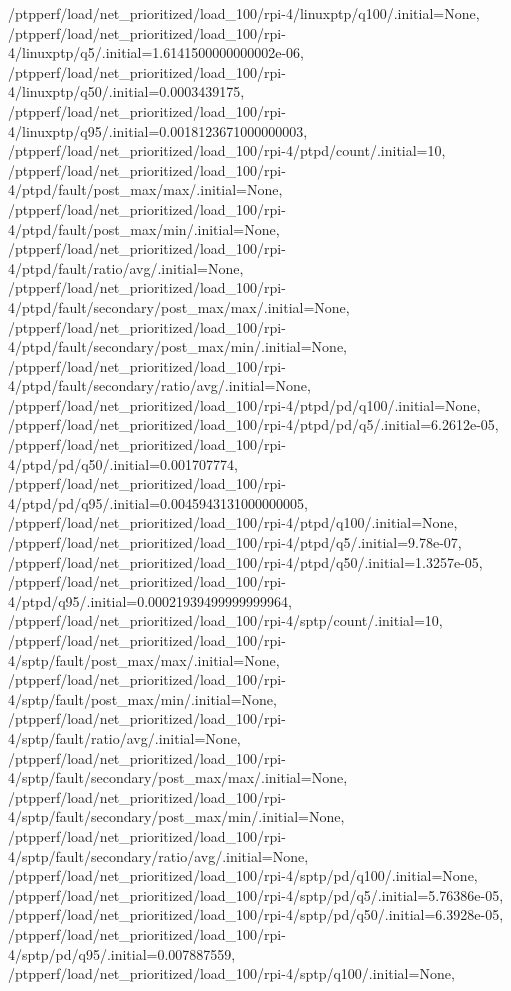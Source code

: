 {    /ptpperf/load/net_prioritized/load_100/rpi-4/linuxptp/q100/.initial=None,
    /ptpperf/load/net_prioritized/load_100/rpi-4/linuxptp/q5/.initial=1.6141500000000002e-06,
    /ptpperf/load/net_prioritized/load_100/rpi-4/linuxptp/q50/.initial=0.0003439175,
    /ptpperf/load/net_prioritized/load_100/rpi-4/linuxptp/q95/.initial=0.0018123671000000003,
    /ptpperf/load/net_prioritized/load_100/rpi-4/ptpd/count/.initial=10,
    /ptpperf/load/net_prioritized/load_100/rpi-4/ptpd/fault/post_max/max/.initial=None,
    /ptpperf/load/net_prioritized/load_100/rpi-4/ptpd/fault/post_max/min/.initial=None,
    /ptpperf/load/net_prioritized/load_100/rpi-4/ptpd/fault/ratio/avg/.initial=None,
    /ptpperf/load/net_prioritized/load_100/rpi-4/ptpd/fault/secondary/post_max/max/.initial=None,
    /ptpperf/load/net_prioritized/load_100/rpi-4/ptpd/fault/secondary/post_max/min/.initial=None,
    /ptpperf/load/net_prioritized/load_100/rpi-4/ptpd/fault/secondary/ratio/avg/.initial=None,
    /ptpperf/load/net_prioritized/load_100/rpi-4/ptpd/pd/q100/.initial=None,
    /ptpperf/load/net_prioritized/load_100/rpi-4/ptpd/pd/q5/.initial=6.2612e-05,
    /ptpperf/load/net_prioritized/load_100/rpi-4/ptpd/pd/q50/.initial=0.001707774,
    /ptpperf/load/net_prioritized/load_100/rpi-4/ptpd/pd/q95/.initial=0.0045943131000000005,
    /ptpperf/load/net_prioritized/load_100/rpi-4/ptpd/q100/.initial=None,
    /ptpperf/load/net_prioritized/load_100/rpi-4/ptpd/q5/.initial=9.78e-07,
    /ptpperf/load/net_prioritized/load_100/rpi-4/ptpd/q50/.initial=1.3257e-05,
    /ptpperf/load/net_prioritized/load_100/rpi-4/ptpd/q95/.initial=0.00021939499999999964,
    /ptpperf/load/net_prioritized/load_100/rpi-4/sptp/count/.initial=10,
    /ptpperf/load/net_prioritized/load_100/rpi-4/sptp/fault/post_max/max/.initial=None,
    /ptpperf/load/net_prioritized/load_100/rpi-4/sptp/fault/post_max/min/.initial=None,
    /ptpperf/load/net_prioritized/load_100/rpi-4/sptp/fault/ratio/avg/.initial=None,
    /ptpperf/load/net_prioritized/load_100/rpi-4/sptp/fault/secondary/post_max/max/.initial=None,
    /ptpperf/load/net_prioritized/load_100/rpi-4/sptp/fault/secondary/post_max/min/.initial=None,
    /ptpperf/load/net_prioritized/load_100/rpi-4/sptp/fault/secondary/ratio/avg/.initial=None,
    /ptpperf/load/net_prioritized/load_100/rpi-4/sptp/pd/q100/.initial=None,
    /ptpperf/load/net_prioritized/load_100/rpi-4/sptp/pd/q5/.initial=5.76386e-05,
    /ptpperf/load/net_prioritized/load_100/rpi-4/sptp/pd/q50/.initial=6.3928e-05,
    /ptpperf/load/net_prioritized/load_100/rpi-4/sptp/pd/q95/.initial=0.007887559,
    /ptpperf/load/net_prioritized/load_100/rpi-4/sptp/q100/.initial=None,
}
